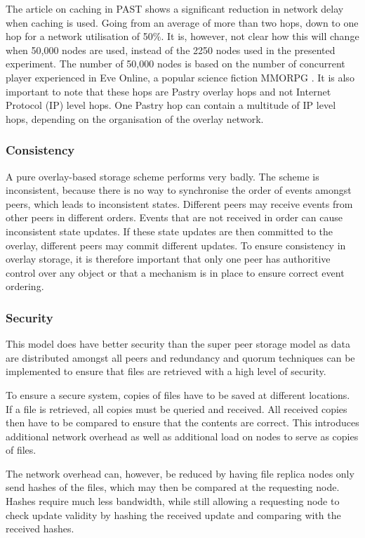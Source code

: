 \documentclass[10pt,a4paper,journal,cspaper,compsoc]{IEEEtran}
\begin{document}
The article on caching in PAST shows a significant reduction in network delay when caching is used. Going from an average of more than two hops, down
to one hop for a network utilisation of 50\%. It is, however, not clear how this will change when 50,000 nodes are used, instead of the 2250 nodes
used in the presented experiment. The number of 50,000 nodes is based on the number of concurrent player experienced in Eve Online, a popular science
fiction MMORPG \cite{eve_pcu}. It is also important to note that these hops are Pastry overlay hops and not Internet Protocol (IP) level hops. One
Pastry hop can contain a multitude of IP level hops, depending on the organisation of the overlay network.


\subsubsection{Consistency}

A pure overlay-based storage scheme performs very badly. The scheme is inconsistent, because there is no way to synchronise the order of events
amongst peers, which leads to inconsistent states. Different peers may receive events from other peers in different orders. Events that are not
received in order can cause inconsistent state updates. If these state updates are then committed to the overlay, different peers may commit
different updates. To ensure consistency in overlay storage, it is therefore important that only one peer has authoritive control over any object or
that a mechanism is in place to ensure correct event ordering.

\subsubsection{Security}
This model does have better security than the super peer storage model as data are distributed amongst all peers and redundancy and quorum techniques
can be implemented to ensure that files are retrieved with a high level of security.

To ensure a secure system, copies of files have to be saved at different locations. If a file is retrieved, all copies must be queried and received.
All received copies then have to be compared to ensure that the contents are correct. This introduces additional network overhead as well as
additional load on nodes to serve as copies of files.

The network overhead can, however, be reduced by having file replica nodes only send hashes of the files, which may then be compared at the
requesting node. Hashes require much less bandwidth, while still allowing a requesting node to check update validity by hashing the received update
and comparing with the received hashes.
\end{document}
